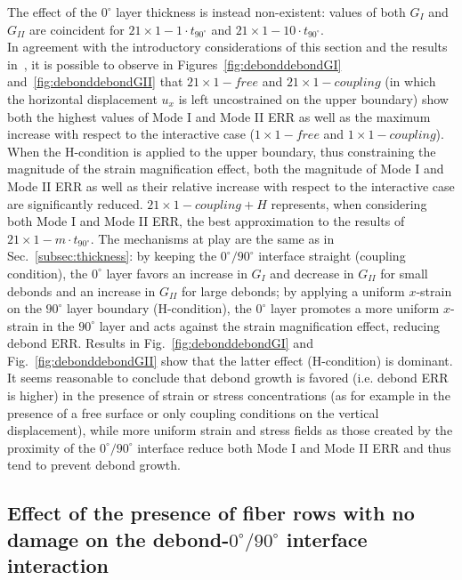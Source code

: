\documentclass[review]{elsarticle}
\begin{document}
The effect of the $0^{\circ}$ layer thickness is instead non-existent: values of both $G_{I}$ and $G_{II}$ are coincident for $21\times 1-1\cdot t_{90^{\circ}}$ and $21\times 1-10\cdot t_{90^{\circ}}$.\\
In agreement with the introductory considerations of this section and the results in~\cite{DiStasio2019}, it is possible to observe in Figures~\ref{fig:debonddebondGI} and~\ref{fig:debonddebondGII} that $21\times 1-free$ and $21\times 1-coupling$ (in which the horizontal displacement $u_{x}$ is left uncostrained on the upper boundary) show both the highest values of Mode I and Mode II ERR as well as the maximum increase with respect to the interactive case ($1\times 1-free$ and $1\times 1-coupling$). When the H-condition is applied to the upper boundary, thus constraining the magnitude of the strain magnification effect, both the magnitude of Mode I and Mode II ERR as well as their relative increase with respect to the interactive case are significantly reduced. $21\times 1-coupling+H$ represents, when considering both Mode I and Mode II ERR, the best approximation to the results of $21\times 1-m\cdot t_{90^{\circ}}$. The mechanisms at play are the same as in Sec.~\ref{subsec:thickness}: by keeping the $0^{\circ}/90^{\circ}$ interface straight (coupling condition), the $0^{\circ}$ layer favors an increase in $G_{I}$ and decrease in $G_{II}$ for small debonds and an increase in $G_{II}$ for large debonds; by applying a uniform $x$-strain on the $90^{\circ}$ layer boundary (H-condition), the $0^{\circ}$ layer promotes a more uniform $x$-strain in the $90^{\circ}$ layer and acts against the strain magnification effect, reducing debond ERR. Results in Fig.~\ref{fig:debonddebondGI} and Fig.~\ref{fig:debonddebondGII} show that the latter effect (H-condition) is dominant. It seems reasonable to conclude that debond growth is favored (i.e. debond ERR is higher) in the presence of strain or stress concentrations (as for example in the presence of a free surface or only coupling conditions on the vertical displacement), while more uniform strain and stress fields as those created by the proximity of the $0^{\circ}/90^{\circ}$ interface reduce both Mode I and Mode II ERR and thus tend to prevent debond growth.

\subsection{Effect of the presence of fiber rows with no damage on the debond-$0^{\circ}/90^{\circ}$ interface interaction}
\end{document}
